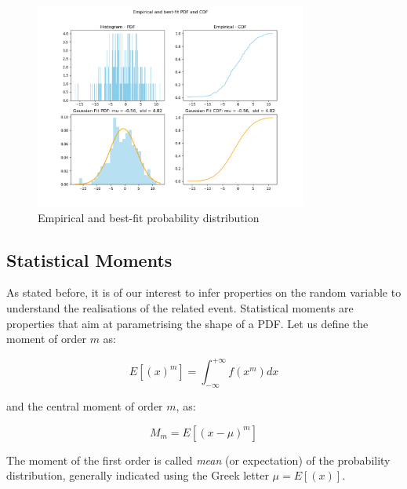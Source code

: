 \begin{figure}[hbt!]
\centering
\includegraphics[width=0.8\textwidth]{SectionLetsMath/elemStat_figures/fig_empiricalPdfCdf.png}
\captionsetup{type=figure}
\caption{Empirical and best-fit probability distribution}
\label{fig_empiricalPdfCdf}
\end{figure}

\subsection{Statistical Moments}
As stated before, it is of our interest to infer properties on the random variable to understand the realisations of the related event. Statistical moments are properties that aim at parametrising the shape of a PDF. Let us define the moment of order $m$ as:

\begin{equation}
E\left[\left(x\right)^m\right]=\int_{-\infty}^{+\infty}f\left(x^m\right)dx
\label{eq_momentOfOrderm}
\end{equation}

and the central moment of order $m$, as:

\begin{equation}
M_m=E[\left(x-\mu\right)^m]
\label{eq_centralMomentOfOrderm}
\end{equation}

The moment of the first order is called \textit{mean} (or expectation) of the probability distribution, generally indicated using the Greek letter $\mu=E[(x)]$.\par

